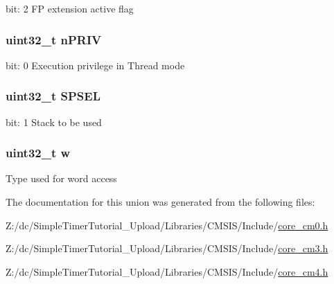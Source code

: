 bit\-: 2 F\-P extension active flag \hypertarget{union_c_o_n_t_r_o_l___type_a2a6e513e8a6bf4e58db169e312172332}{
\subsubsection[{n\-P\-R\-I\-V}]{\setlength{\rightskip}{0pt plus 5cm}uint32\-\_\-t n\-P\-R\-I\-V}}\label{union_c_o_n_t_r_o_l___type_a2a6e513e8a6bf4e58db169e312172332}
bit\-: 0 Execution privilege in Thread mode \hypertarget{union_c_o_n_t_r_o_l___type_ae185aac93686ffc78e998a9daf41415b}{
\subsubsection[{S\-P\-S\-E\-L}]{\setlength{\rightskip}{0pt plus 5cm}uint32\-\_\-t S\-P\-S\-E\-L}}\label{union_c_o_n_t_r_o_l___type_ae185aac93686ffc78e998a9daf41415b}
bit\-: 1 Stack to be used \hypertarget{union_c_o_n_t_r_o_l___type_ad0fb62e7a08e70fc5e0a76b67809f84b}{
\subsubsection[{w}]{\setlength{\rightskip}{0pt plus 5cm}uint32\-\_\-t w}}\label{union_c_o_n_t_r_o_l___type_ad0fb62e7a08e70fc5e0a76b67809f84b}
Type used for word access 

The documentation for this union was generated from the following files\-:\begin{DoxyCompactItemize}
\item 
Z\-:/dc/\-Simple\-Timer\-Tutorial\-\_\-\-Upload/\-Libraries/\-C\-M\-S\-I\-S/\-Include/\hyperlink{core__cm0_8h}{core\-\_\-cm0.\-h}\item 
Z\-:/dc/\-Simple\-Timer\-Tutorial\-\_\-\-Upload/\-Libraries/\-C\-M\-S\-I\-S/\-Include/\hyperlink{core__cm3_8h}{core\-\_\-cm3.\-h}\item 
Z\-:/dc/\-Simple\-Timer\-Tutorial\-\_\-\-Upload/\-Libraries/\-C\-M\-S\-I\-S/\-Include/\hyperlink{core__cm4_8h}{core\-\_\-cm4.\-h}\end{DoxyCompactItemize}
